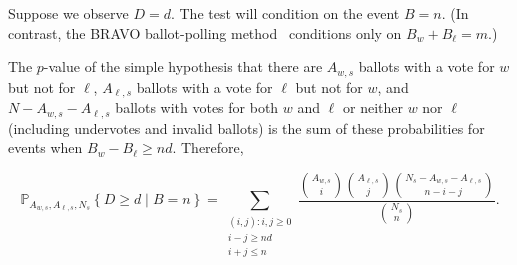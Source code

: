 Suppose we observe $D=d$.
The test will condition on the event $B=n$. 
(In contrast, the BRAVO ballot-polling
method~\cite{lindemanEtal12}
conditions only on $B_w+B_\ell = m$.)

The $p$-value of the simple hypothesis that there are $A_{w,s}$ ballots with
a vote for $w$ but not for $\ell$, $A_{\ell,s}$ ballots with a vote for $\ell$ but not for $w$, 
and $N - A_{w,s} - A_{\ell,s}$ ballots with votes for both $w$ and $\ell$ or neither $w$ nor $\ell$ 
(including undervotes and
invalid ballots) is the sum of these probabilities for events when $B_w - B_\ell \geq nd$.
Therefore,

\begin{equation}
   \mathbb{P}_{A_{w,s}, A_{\ell,s}, N_s} \left \{ D \geq d \;\vert\; B = n\right \} = 
   \sum_{\substack{(i, j) :  i, j\ge 0 \\ i-j \geq nd \\ i+j \leq n}} \frac{ {A_{w,s } \choose i}{A_{\ell,s} \choose j}{N_s - A_{w,s} - A_{\ell,s} \choose n-i-j}}{{N_s \choose n}}.
\end{equation}


